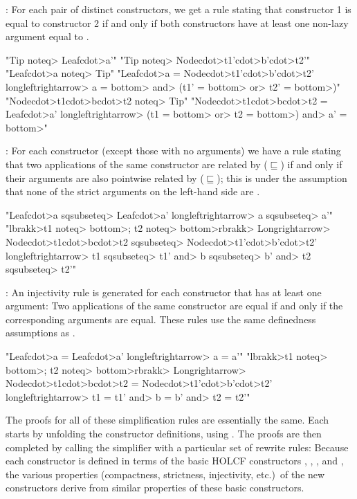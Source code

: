 \begin{itemize*}
\item {}: For each pair of distinct constructors, we get a rule stating that constructor 1 is equal to constructor 2 if and only if both constructors have at least one non-lazy argument equal to .
%
\begin{isacode}
"Tip \<noteq> Leaf\<cdot>a'"
"Tip \<noteq> Node\<cdot>t1'\<cdot>b'\<cdot>t2'"
"Leaf\<cdot>a \<noteq> Tip"
"Leaf\<cdot>a = Node\<cdot>t1'\<cdot>b'\<cdot>t2' \<longleftrightarrow> a = \<bottom> \<and> (t1' = \<bottom> \<or> t2' = \<bottom>)"
"Node\<cdot>t1\<cdot>b\<cdot>t2 \<noteq> Tip"
"Node\<cdot>t1\<cdot>b\<cdot>t2 = Leaf\<cdot>a' \<longleftrightarrow> (t1 = \<bottom> \<or> t2 = \<bottom>) \<and> a' = \<bottom>"
\end{isacode}

\item {}: For each constructor (except those with no arguments) we have a rule stating that two applications of the same constructor are related by ($\sqsubseteq$) if and only if their arguments are also pointwise related by ($\sqsubseteq$); this is under the assumption that none of the strict arguments on the left-hand side are . 
%
\begin{isacode}
"Leaf\<cdot>a \<sqsubseteq> Leaf\<cdot>a' \<longleftrightarrow> a \<sqsubseteq> a'"
"\<lbrakk>t1 \<noteq> \<bottom>; t2 \<noteq> \<bottom>\<rbrakk>
  \<Longrightarrow> Node\<cdot>t1\<cdot>b\<cdot>t2 \<sqsubseteq> Node\<cdot>t1'\<cdot>b'\<cdot>t2' \<longleftrightarrow> t1 \<sqsubseteq> t1' \<and> b \<sqsubseteq> b' \<and> t2 \<sqsubseteq> t2'"
\end{isacode}

\item {}: An injectivity rule is generated for each constructor that has at least one argument: Two applications of the same constructor are equal if and only if the corresponding arguments are equal. These rules use the same definedness assumptions as .
%
\begin{isacode}
"Leaf\<cdot>a = Leaf\<cdot>a' \<longleftrightarrow> a = a'"
"\<lbrakk>t1 \<noteq> \<bottom>; t2 \<noteq> \<bottom>\<rbrakk>
  \<Longrightarrow> Node\<cdot>t1\<cdot>b\<cdot>t2 = Node\<cdot>t1'\<cdot>b'\<cdot>t2' \<longleftrightarrow> t1 = t1' \<and> b = b' \<and> t2 = t2'"
\end{isacode}
\end{itemize*}

The proofs for all of these simplification rules are essentially the same. Each starts by unfolding the constructor definitions, using . The proofs are then completed by calling the simplifier with a particular set of rewrite rules: Because each constructor is defined in terms of the basic HOLCF constructors , , , and , the various properties (compactness, strictness, injectivity, etc.)\ of the new constructors derive from similar properties of these basic constructors.

